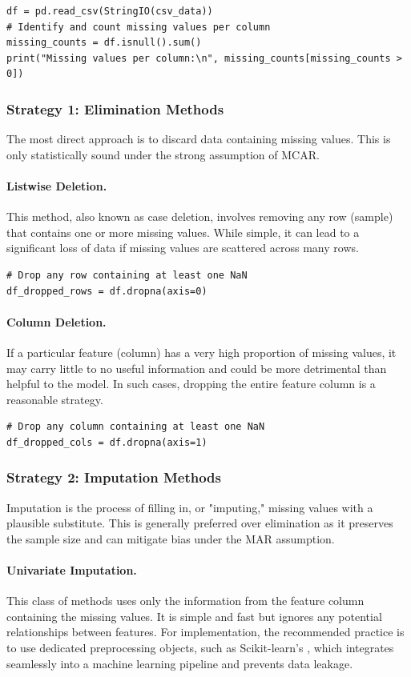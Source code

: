 \begin{itemize}
\begin{verbatim}
df = pd.read_csv(StringIO(csv_data))
# Identify and count missing values per column
missing_counts = df.isnull().sum()
print("Missing values per column:\n", missing_counts[missing_counts > 0])
\end{verbatim}

\subsubsection*{Strategy 1: Elimination Methods}
The most direct approach is to discard data containing missing values. This is only statistically sound under the strong assumption of MCAR.

\paragraph{Listwise Deletion.} This method, also known as case deletion, involves removing any row (sample) that contains one or more missing values. While simple, it can lead to a significant loss of data if missing values are scattered across many rows.
\begin{verbatim}
# Drop any row containing at least one NaN
df_dropped_rows = df.dropna(axis=0)
\end{verbatim}

\paragraph{Column Deletion.} If a particular feature (column) has a very high proportion of missing values, it may carry little to no useful information and could be more detrimental than helpful to the model. In such cases, dropping the entire feature column is a reasonable strategy.
\begin{verbatim}
# Drop any column containing at least one NaN
df_dropped_cols = df.dropna(axis=1)
\end{verbatim}

\subsubsection*{Strategy 2: Imputation Methods}
Imputation is the process of filling in, or "imputing," missing values with a plausible substitute. This is generally preferred over elimination as it preserves the sample size and can mitigate bias under the MAR assumption.

\paragraph{Univariate Imputation.} This class of methods uses only the information from the feature column containing the missing values. It is simple and fast but ignores any potential relationships between features. For implementation, the recommended practice is to use dedicated preprocessing objects, such as Scikit-learn's , which integrates seamlessly into a machine learning pipeline and prevents data leakage.


\end{itemize}
